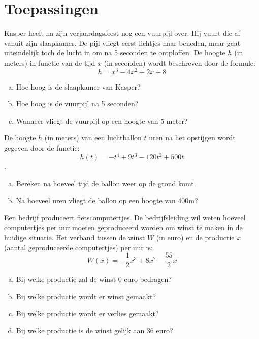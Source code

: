\documentclass[12pt]{article}
\begin{document}
\newpage
\section{Toepassingen}

\begin{oefening}
Kasper heeft na zijn verjaardagsfeest nog een vuurpijl over. Hij vuurt die af vanuit zijn slaapkamer. De pijl vliegt eerst lichtjes naar beneden, maar gaat uiteindelijk toch de lucht in om na 5 seconden te ontploffen. De hoogte $h$ (in meters) in functie van de tijd $x$ (in seconden) wordt beschreven door de formule:
$$h=x^3-4x^2+2x+8$$
\begin{enumerate}[(a)]
  \item Hoe hoog is de slaapkamer van Kasper?
  \item Hoe hoog is de vuurpijl na 5 seconden?
  \item Wanneer vliegt de vuurpijl op een hoogte van 5 meter?
\end{enumerate}
\end{oefening}

\begin{oefening}
De hoogte $h$ (in meters) van een luchtballon $t$ uren na het opstijgen wordt gegeven door de functie:
$$h(t)=-t^4+9t^3-120t^2+500t$$.
\begin{enumerate}[(a)]
  \item Bereken na hoeveel tijd de ballon weer op de grond komt.
  \item Na hoeveel uren vliegt de ballon op een hoogte van 400m?
\end{enumerate}
\end{oefening}

\begin{oefening}
Een bedrijf produceert fietscomputertjes. De bedrijfsleiding wil weten hoeveel computertjes per uur moeten geproduceerd worden om winst te maken in de huidige situatie. Het verband tussen de winst $W$ (in euro) en de productie $x$ (aantal geproduceerde computertjes) per uur is:
$$W(x)=-\dfrac{1}{2}x^3+8x^2-\dfrac{55}{2}x$$
\begin{enumerate}[(a)]
  \item Bij welke productie zal de winst 0 euro bedragen?
  \item Bij welke productie wordt er winst gemaakt?
  \item Bij welke productie wordt er verlies gemaakt?
  \item Bij welke productie is de winst gelijk aan 36 euro?
\end{enumerate}
\end{oefening}
\end{document}

